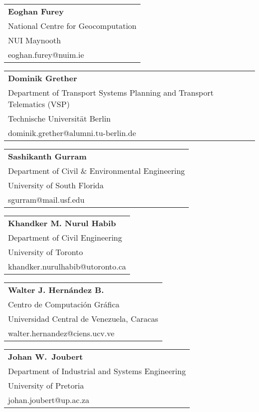 \begin{tabular}[width=0.48\textwidth]{@{}l}
\textbf{Eoghan Furey} \\
National Centre for Geocomputation \\
NUI Maynooth \\
eoghan.furey@nuim.ie \\
\end{tabular}

\begin{tabular}[width=0.48\textwidth]{@{}l}
\textbf{Dominik Grether} \\
Department of Transport Systems Planning and Transport Telematics (VSP) \\
Technische Universität Berlin \\
dominik.grether@alumni.tu-berlin.de\\
\end{tabular}

\begin{tabular}[width=0.48\textwidth]{@{}l}
\textbf{Sashikanth Gurram} \\
Department of Civil \& Environmental Engineering \\
University of South Florida \\
sgurram@mail.usf.edu \\
\end{tabular}

\begin{tabular}[width=0.48\textwidth]{@{}l}
\textbf{Khandker M. Nurul Habib} \\
Department of Civil Engineering \\
University of Toronto \\
khandker.nurulhabib@utoronto.ca  \\
\end{tabular}

\begin{tabular}[width=0.48\textwidth]{@{}l}
\textbf{Walter J. Hernández B.} \\
Centro de Computación Gráfica \\
Universidad Central de Venezuela, Caracas \\
walter.hernandez@ciens.ucv.ve \\
\end{tabular}

\begin{tabular}[width=0.48\textwidth]{@{}l}
\textbf{Johan W.\ Joubert} \\
Department of Industrial and Systems Engineering \\
University of Pretoria \\
johan.joubert@up.ac.za  \\
\end{tabular}

